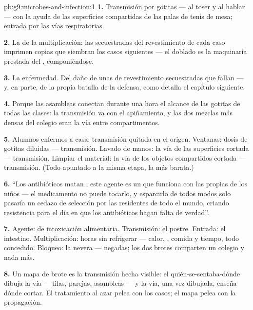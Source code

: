 \begin{solution}{pb:g9:microbes-and-infection:1}
\textbf{1.} Transmisión por gotitas --- al toser y al hablar --- con la
ayuda de las superficies compartidas de las palas de tenis de mesa;
entrada por las vías respiratorias.

\textbf{2.} La de la multiplicación: las  secuestradas del
revestimiento de cada caso imprimen copias que siembran los casos
siguientes --- el doblado es la maquinaria prestada del ,
componiéndose.

\textbf{3.} La enfermedad. Del daño de unas  de revestimiento
secuestradas que fallan --- y, en parte, de la propia batalla de la
defensa, como detalla el capítulo siguiente.

\textbf{4.} Porque las asambleas conectan durante una hora el alcance
de las gotitas de todas las clases: la transmisión va con el
apiñamiento, y las dos mezclas más densas del colegio eran la vía entre
compartimentos.

\textbf{5.} Alumnos enfermos a casa: transmisión quitada en el origen.
Ventanas: dosis de gotitas diluidas --- transmisión. Lavado de manos:
la vía de las superficies cortada --- transmisión. Limpiar el material:
la vía de los objetos compartidos cortada --- transmisión. (Todo
apuntado a la misma etapa, la más barata.)

\textbf{6.} ``Los antibióticos matan ; este agente es un 
que funciona con las propias  de los niños --- el medicamento no
puede tocarlo, y esparcirlo de todos modos solo pasaría un cedazo de
selección por las  residentes de todo el mundo, criando
resistencia para el día en que los antibióticos hagan falta de
verdad''.

\textbf{7.} Agente:  de intoxicación alimentaria.
Transmisión: el postre. Entrada: el intestino. Multiplicación: horas
sin refrigerar --- calor, , comida y tiempo, todo concedido.
Bloqueo: la nevera ---  negadas; los dos brotes comparten un
colegio y nada más.

\textbf{8.} Un mapa de brote es la transmisión hecha visible: el
quién-se-sentaba-dónde dibuja la vía --- filas, parejas, asambleas ---
y la vía, una vez dibujada, enseña dónde cortar. El tratamiento al azar
pelea con los casos; el mapa pelea con la propagación.


\end{solution}
